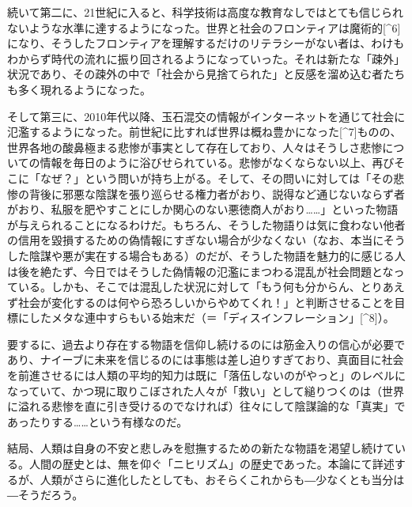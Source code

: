 続いて第二に、21世紀に入ると、科学技術は高度な教育なしではとても信じられないような水準に達するようになった。世界と社会のフロンティアは魔術的{[}\^{}6{]}になり、そうしたフロンティアを理解するだけのリテラシーがない者は、わけもわからず時代の流れに振り回されるようになっていった。それは新たな「疎外」状況であり、その疎外の中で「社会から見捨てられた」と反感を溜め込む者たちも多く現れるようになった。

そして第三に、2010年代以降、玉石混交の情報がインターネットを通じて社会に氾濫するようになった。前世紀に比すれば世界は概ね豊かになった{[}\^{}7{]}ものの、世界各地の酸鼻極まる悲惨が事実として存在しており、人々はそうしさ悲惨についての情報を毎日のように浴びせられている。悲惨がなくならない以上、再びそこに「なぜ？」という問いが持ち上がる。そして、その問いに対しては「その悲惨の背後に邪悪な陰謀を張り巡らせる権力者がおり、説得など通じないならず者がおり、私服を肥やすことにしか関心のない悪徳商人がおり\ldots\ldots」といった物語が与えられることになるわけだ。もちろん、そうした物語りは気に食わない他者の信用を毀損するための偽情報にすぎない場合が少なくない（なお、本当にそうした陰謀や悪が実在する場合もある）のだが、そうした物語を魅力的に感じる人は後を絶たず、今日ではそうした偽情報の氾濫にまつわる混乱が社会問題となっている。しかも、そこでは混乱した状況に対して「もう何も分からん、とりあえず社会が変化するのは何やら恐ろしいからやめてくれ！」と判断させることを目標にしたメタな連中すらもいる始末だ（＝「ディスインフレーション」{[}\^{}8{]}）。

要するに、過去より存在する物語を信仰し続けるのには筋金入りの信心が必要であり、ナイーブに未来を信じるのには事態は差し迫りすぎており、真面目に社会を前進させるには人類の平均的知力は既に「落伍しないのがやっと」のレベルになっていて、かつ現に取りこぼされた人々が「救い」として縋りつくのは（世界に溢れる悲惨を直に引き受けるのでなければ）往々にして陰謀論的な「真実」であったりする\ldots\ldots という有様なのだ。

結局、人類は自身の不安と悲しみを慰撫するための新たな物語を渇望し続けている。人間の歴史とは、無を仰ぐ「ニヒリズム」の歴史であった。本論にて詳述するが、人類がさらに進化したとしても、おそらくこれからも―少なくとも当分は―そうだろう。

